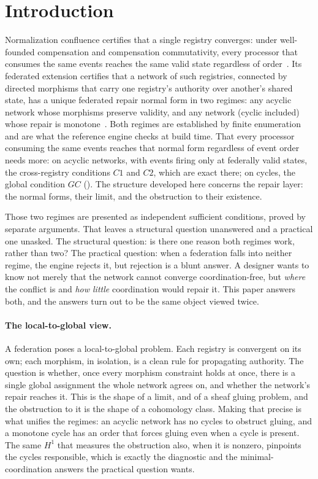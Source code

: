 \documentclass[11pt,a4paper]{article}
\theoremstyle{plain}
\theoremstyle{definition}
\theoremstyle{remark}
\newcommand{\Ho}{H^1}
\renewcommand{\_}{\origunderscore\allowbreak}
\begin{document}
\clearpage

\section{Introduction}
\label{sec:intro}

Normalization confluence certifies that a single registry converges: under well-founded compensation
and compensation commutativity, every processor that consumes the same events reaches the same valid
state regardless of order~\cite{blackwell2026nc}. Its federated extension certifies that a network of
such registries, connected by directed morphisms that carry one registry's authority over another's
shared state, has a unique federated repair normal form in two regimes: any acyclic network whose
morphisms preserve validity, and any network (cyclic included) whose repair is
monotone~\cite{blackwell2026federated}. Both regimes are established by finite enumeration and are
what the reference engine checks at build time. That every processor consuming the same events
reaches that normal form regardless of event order needs more: on acyclic networks, with events
firing only at federally valid states, the cross-registry conditions $C1$ and $C2$, which are exact
there; on cycles, the global condition $GC$ (). The structure developed here
concerns the repair layer: the normal forms, their limit, and the obstruction to their existence.

Those two regimes are presented as independent sufficient conditions, proved by separate arguments.
That leaves a structural question unanswered and a practical one unasked. The structural question:
is there one reason both regimes work, rather than two? The practical question: when a federation
falls into neither regime, the engine rejects it, but rejection is a blunt answer. A designer wants
to know not merely that the network cannot converge coordination-free, but \emph{where} the conflict
is and \emph{how little} coordination would repair it. This paper answers both, and the answers turn
out to be the same object viewed twice.

\paragraph{The local-to-global view.}
A federation poses a local-to-global problem. Each registry is convergent on its own; each morphism,
in isolation, is a clean rule for propagating authority. The question is whether, once every morphism
constraint holds at once, there is a single global assignment the whole network agrees on, and
whether the network's repair reaches it. This is the shape of a limit, and of a sheaf gluing
problem, and the obstruction to it is the shape of a cohomology class. Making that precise is what
unifies the regimes: an acyclic network has no cycles to obstruct gluing, and a monotone cycle has an
order that forces gluing even when a cycle is present. The same $\Ho$ that measures the obstruction
also, when it is nonzero, pinpoints the cycles responsible, which is exactly the diagnostic and the
minimal-coordination answers the practical question wants.
\end{document}
